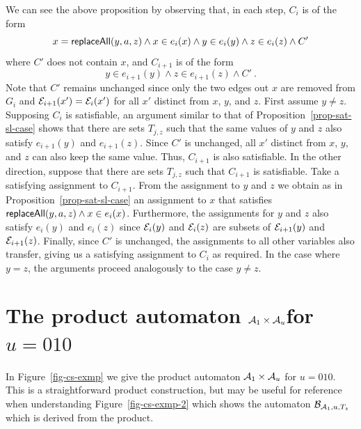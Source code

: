 We can see the above proposition by observing that, in each step, $C_i$ is of the form
\[
    x = \mathsf{replaceAll}(y, a, z) \wedge x \in e_i(x) \wedge y \in e_i(y) \wedge z \in e_i(z) \wedge C'
\]
where $C'$ does not contain $x$, and $C_{i+1}$ is of the form
\[
    y \in e_{i+1}(y) \wedge z \in e_{i+1}(z) \wedge C' \ .
\]
Note that $C'$ remains unchanged since only the two edges out $x$ are removed from $G_i$ and $\mathcal{E}_{i+1}(x') = \mathcal{E}_i(x')$ for all $x'$ distinct from $x$, $y$, and $z$.
First assume $y \neq z$.
Supposing $C_i$ is satisfiable, an argument similar to that of Proposition~\ref{prop-sat-sl-case} shows that there are sets $T_{j,z}$ such that the same values of $y$ and $z$ also satisfy $e_{i+1}(y)$ and $e_{i+1}(z)$.
Since $C'$ is unchanged, all $x'$ distinct from $x$, $y$, and $z$ can also keep the same value.
Thus, $C_{i+1}$ is also satisfiable.
In the other direction, suppose that there are sets $T_{j, z}$ such that $C_{i+1}$ is satisfiable. Take a satisfying assignment to $C_{i+1}$.
From the assignment to $y$ and $z$ we obtain as in Proposition~\ref{prop-sat-sl-case} an assignment to $x$ that satisfies $\mathsf{replaceAll}(y, a, z) \wedge x \in e_i(x)$.
Furthermore, the assignments for $y$ and $z$ also satisfy $e_i(y)$ and $e_i(z)$ since $\mathcal{E}_i(y)$ and $\mathcal{E}_i(z)$ are subsets of $\mathcal{E}_{i+1}(y)$ and $\mathcal{E}_{i+1}(z)$.
Finally, since $C'$ is unchanged, the assignments to all other variables also transfer, giving us a satisfying assignment to $C_i$ as required.
In the case where $y = z$, the arguments proceed analogously to the case $y \neq z$.

\def\prodauttitle{$\cA_1 \times \cA_u$}
\def\defutitle{$u = 010$}
\section{The product automaton \protect\prodauttitle for \protect\defutitle}

In Figure~\ref{fig-cs-exmp} we give the product automaton $\mathcal{A}_1 \times \mathcal{A}_u$ for $u = 010$.
This is a straightforward product construction, but may be useful for reference when understanding Figure~\ref{fig-cs-exmp-2} which shows the automaton $\mathcal{B}_{\mathcal{A}_1, u, T_z}$ which is derived from the product.

